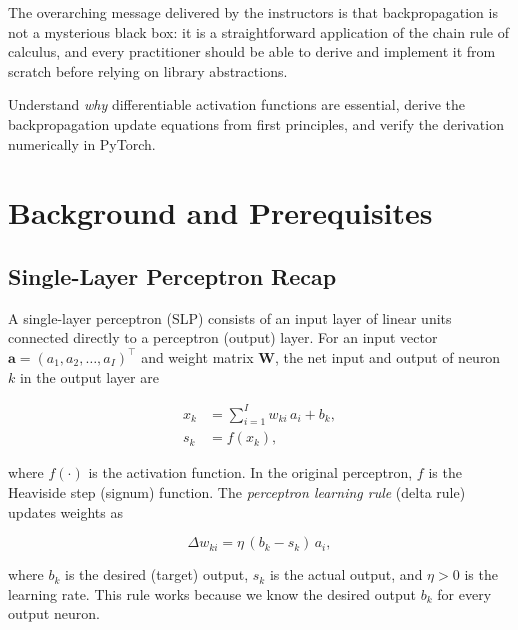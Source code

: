 \documentclass[12pt,a4paper]{article}
\begin{document}
The overarching message delivered by the instructors is that backpropagation is
not a mysterious black box: it is a straightforward application of the chain
rule of calculus, and every practitioner should be able to derive and implement
it from scratch before relying on library abstractions.

\begin{keyinsight}[title=Session Objective]
Understand \emph{why} differentiable activation functions are essential, derive
the backpropagation update equations from first principles, and verify the
derivation numerically in PyTorch.
\end{keyinsight}

\section{Background and Prerequisites}
\label{sec:background}

\subsection{Single-Layer Perceptron Recap}

A single-layer perceptron (SLP) consists of an input layer of linear units
connected directly to a perceptron (output) layer.  For an input vector
$\mathbf{a} = (a_1, a_2, \ldots, a_I)^{\top}$ and weight matrix $\mathbf{W}$,
the net input and output of neuron $k$ in the output layer are

\begin{align}
  x_k &= \sum_{i=1}^{I} w_{ki}\,a_i + b_k, \label{eq:slp-net}\\
  s_k &= f(x_k), \label{eq:slp-out}
\end{align}

where $f(\cdot)$ is the activation function.  In the original perceptron,
$f$ is the Heaviside step (signum) function.  The \emph{perceptron learning
rule} (delta rule) updates weights as

\begin{equation}
  \Delta w_{ki} = \eta\,(b_k - s_k)\,a_i,
  \label{eq:perceptron-rule}
\end{equation}

where $b_k$ is the desired (target) output, $s_k$ is the actual output, and
$\eta > 0$ is the learning rate.  This rule works because we know the desired
output $b_k$ for every output neuron.
\end{document}
